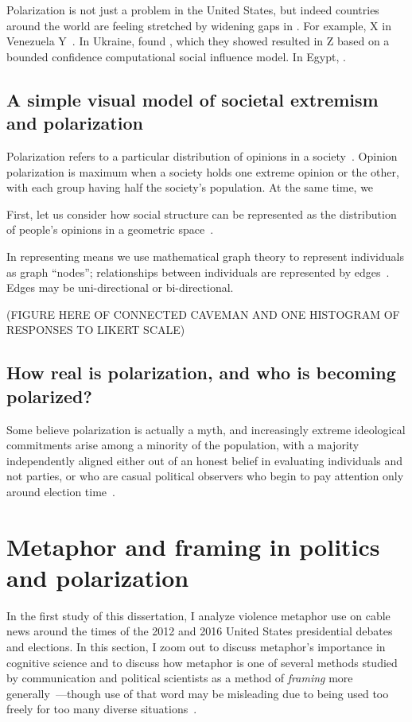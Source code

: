 \documentclass[12pt,letterpaper]{article}
\begin{document}
Polarization is not just a problem in the United States, but indeed countries
around the world are feeling stretched by widening gaps in . For example,
X in Venezuela Y~\cite{Morales2015}. In Ukraine,  found , 
which they showed resulted
in Z based on a bounded confidence computational social influence model. 
In Egypt, \cite{Borge-Holthoefer2014}.


\subsection{A simple visual model of societal extremism and polarization}

Polarization refers to a particular distribution of opinions in a 
society~\cite{Blau1974,Bramson2016,Turner2018}. Opinion polarization is maximum when
a society holds one extreme opinion or the other, with each group having half
the society's population. At the same time, we 

First, let us consider how social structure can be represented as
the distribution of people's opinions in a geometric space~\cite{Blau1974}.

In representing  means we use mathematical graph theory to represent 
individuals as graph ``nodes''; relationships between individuals
are represented by edges~\cite{Friedkin1998,Barabasi2016}. 
Edges may be uni-directional or bi-directional.


(FIGURE HERE OF CONNECTED CAVEMAN AND ONE HISTOGRAM OF RESPONSES TO LIKERT SCALE)

\subsection{How real is polarization, and who is becoming polarized?}

Some believe polarization is actually a myth, and increasingly 
extreme ideological commitments arise among a minority of the population,
with a majority independently aligned either out of an honest belief in 
evaluating individuals and not parties, or who are casual political
observers who begin to pay attention only around election time~\cite{Kinder2017}.

\section{Metaphor and framing in politics and polarization}

In the first study of this dissertation, I analyze violence metaphor use on
cable news around the times of the 2012 and 2016 United States presidential
debates and elections. In this section, I zoom out to discuss metaphor's
importance in cognitive science and to discuss how metaphor is one of several
methods studied by communication and political scientists as a method of
\emph{framing} more generally~\cite{Fillmore1982}---though use of that 
word may be misleading due to being used too freely for too many 
diverse situations~\cite{Cacciatore2016}.
\end{document}
